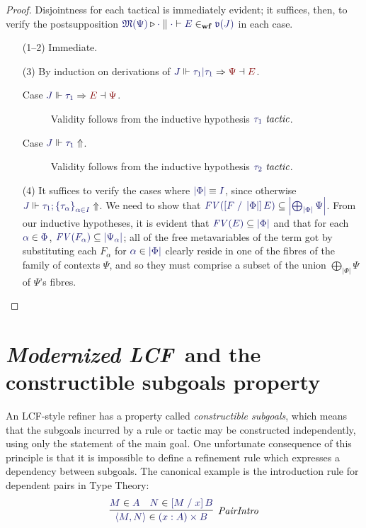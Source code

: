 \documentclass[11pt]{article}
\theoremstyle{definition}
\theoremstyle{remark}
\numberwithin{equation}{section}
\def\IModeColorName{MidnightBlue}
\def\OModeColorName{Maroon}
\newcommand\IMode[1]{{\color{\IModeColorName}{#1}}}
\newcommand\OMode[1]{{\color{\OModeColorName}{#1}}}
\newcommand\JJ{J}
\newcommand\IsTac[1]{\IMode{#1}\ \textit{tactic}}
\newcommand\MkSet[1]{\left\{#1\right\}}
\newcommand\MkFam[3]{\MkSet{#1_{#2}}_{#2\in #3}}
\newcommand\IsWf[5]{%
  \IMode{#1}\triangleright%
  \IMode{#2}\parallel%
  \IMode{#3}\vdash%
  \IMode{#4}\in_{\mathbf{wf}}\IMode{#5}%
}
\newcommand\JdgValence[1]{\mathfrak{v}(#1)}
\newcommand\Metavars[1]{\mathfrak{M}(#1)}
\newcommand\Refine[4]{\IMode{#1}\Vdash\IMode{#2}\Rightarrow\OMode{#4}\dashv\OMode{#3}}
\newcommand\NoRefine[2]{\IMode{#1}\Vdash\IMode{#2}\Uparrow}
\newcommand\Member[2]{\IMode{#1}\in\IMode{#2}}
\newcommand\OrElseTac[2]{#1\vert#2}
\newcommand\ThenTac[2]{#1;#2}
\newcommand\TyDPair[3]{(#2:#1) \times #3}
\newcommand\Tuple[1]{\left\langle#1\right\rangle}
\newcommand\Dom[1]{\left\vert#1\right\vert}
\newcommand\SubsetEq[2]{\IMode{#1}\subseteq\IMode{#2}}
\newcommand\FV[1]{\textit{FV}\left(#1\right)}
\newcommand\Subst[3]{\left[#1\;/\;#2\right]#3}
\newcommand\ModLCF{\textbf{\emph{Modernized LCF}}}
\newcommand\IsEquiv[2]{\IMode{#1}\equiv\IMode{#2}}
\begin{document}
\begin{proof}
  Disjointness for each tactical is immediately evident; it suffices, then, to
  verify the postsupposition
  $\IsWf{\Metavars{\Psi}}{\cdot}{\cdot}{E}{\JdgValence{\JJ}}$ in each case.
  \begin{enumerate}
    \item[(1--2)] Immediate.
    \item[(3)]
      By induction on derivations of
      $\Refine{\JJ}{\OrElseTac{\tau_1}{\tau_1}}{E}{\Psi}$.
      \begin{description}
        \item[Case $\Refine{\JJ}{\tau_1}{\Psi}{E}$.] Validity follows from the
          inductive hypothesis $\IsTac{\tau_1}$.
        \item[Case $\NoRefine{\JJ}{\tau_1}$.] Validity follows from the
          inductive hypothesis $\IsTac{\tau_2}$.
      \end{description}

    \item[(4)] It suffices to verify the cases where
      $\IsEquiv{\Dom\Phi}{I}$, since otherwise
      $\NoRefine{\JJ}{\ThenTac{\tau_1}{\MkFam{\tau}{\alpha}{I}}}$.
      We need to show that
      $\SubsetEq{\FV{\Subst{F}{\Dom\Phi}{E}}}{\Dom{\bigoplus_{\Dom\Phi}\Psi}}$.
      From our inductive hypotheses, it is evident that
      $\SubsetEq{\FV{E}}{\Dom\Phi}$ and that for each $\Member{\alpha}{\Phi}$,
      $\SubsetEq{\FV{F_\alpha}}{\Dom{\Psi_\alpha}}$; all of the free metavariables
      of the term got by substituting each $F_\alpha$ for
      $\Member{\alpha}{\Dom\Phi}$ clearly reside in one of the fibres of the
      family of contexts $\Psi$, and so they must comprise a subset of the
      union $\bigoplus_{\Dom\Phi}\Psi$ of $\Psi$'s fibres.

  \end{enumerate}
\end{proof}

\section{\ModLCF\ and the constructible subgoals property}

An LCF-style refiner has a property called \emph{constructible subgoals}, which
means that the subgoals incurred by a rule or tactic may be constructed
independently, using only the statement of the main goal. One unfortunate
consequence of this principle is that it is impossible to define a refinement
rule which expresses a dependency between subgoals. The canonical example is
the introduction rule for dependent pairs in Type Theory:
\[
  \infer[\textit{PairIntro}]{
    \Member{\Tuple{M,N}}{\TyDPair{A}{x}{B}}
  }{
    \Member{M}{A} &
    \Member{N}{\Subst{M}{x}{B}}
  }
\]
\end{document}
